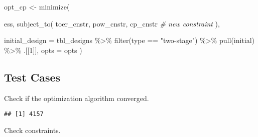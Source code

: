 \documentclass[
]{book}
\newenvironment{Shaded}{\begin{snugshade}}{\end{snugshade}}
\newcommand{\AttributeTok}[1]{\textcolor[rgb]{0.77,0.63,0.00}{#1}}
\newcommand{\CommentTok}[1]{\textcolor[rgb]{0.56,0.35,0.01}{\textit{#1}}}
\newcommand{\DecValTok}[1]{\textcolor[rgb]{0.00,0.00,0.81}{#1}}
\newcommand{\FunctionTok}[1]{\textcolor[rgb]{0.00,0.00,0.00}{#1}}
\newcommand{\NormalTok}[1]{#1}
\newcommand{\OtherTok}[1]{\textcolor[rgb]{0.56,0.35,0.01}{#1}}
\newcommand{\SpecialCharTok}[1]{\textcolor[rgb]{0.00,0.00,0.00}{#1}}
\newcommand{\StringTok}[1]{\textcolor[rgb]{0.31,0.60,0.02}{#1}}
\begin{document}
\begin{Shaded}
\begin{Highlighting}[]
\NormalTok{opt\_cp }\OtherTok{\textless{}{-}} \FunctionTok{minimize}\NormalTok{(}
      
\NormalTok{    ess,}
    \FunctionTok{subject\_to}\NormalTok{(}
\NormalTok{        toer\_cnstr,}
\NormalTok{        pow\_cnstr,}
\NormalTok{        cp\_cnstr }\CommentTok{\# new constraint}
\NormalTok{    ),}

    \AttributeTok{initial\_design =}\NormalTok{ tbl\_designs }\SpecialCharTok{\%\textgreater{}\%} 
        \FunctionTok{filter}\NormalTok{(type }\SpecialCharTok{==} \StringTok{"two{-}stage"}\NormalTok{) }\SpecialCharTok{\%\textgreater{}\%} 
        \FunctionTok{pull}\NormalTok{(initial) }\SpecialCharTok{\%\textgreater{}\%} 
\NormalTok{        .[[}\DecValTok{1}\NormalTok{]],}
    \AttributeTok{opts =}\NormalTok{ opts )}
\end{Highlighting}
\end{Shaded}

\hypertarget{test-cases-2}{%
\subsection{Test Cases}\label{test-cases-2}}

Check if the optimization algorithm converged.

\begin{Shaded}
\end{Shaded}

\begin{verbatim}
## [1] 4157
\end{verbatim}

Check constraints.
\end{document}
